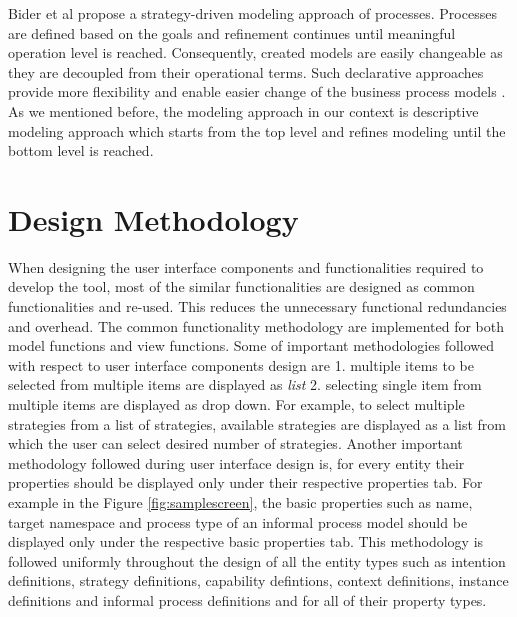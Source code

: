 Bider et al \cite{bider2005strategy} propose a strategy-driven modeling approach of processes. Processes are defined based on the goals and refinement continues until meaningful operation level is reached. Consequently, created models are easily changeable as they are decoupled from their operational terms. Such declarative approaches provide more flexibility and enable easier change of the business process models \cite{Sungur2016}. As we mentioned before, the modeling approach in our context is descriptive modeling approach which starts from the top level and refines modeling until the bottom level is reached. 

\section{Design Methodology}
\label{sec:designmethodology}
When designing the user interface components and functionalities required to develop the tool, most of the similar functionalities are 
designed as common functionalities and re-used. This reduces the unnecessary functional redundancies and overhead. The common functionality methodology are implemented for both model functions and view functions.  Some of important methodologies followed with respect to user interface components design are 1. multiple items to be selected from multiple items are displayed as  \textit{list} 2. selecting single item from multiple items are displayed as drop down. For example, to select multiple strategies from a list of strategies, available strategies are displayed as a list from which the user can select desired number of strategies. Another important methodology followed during user interface design is, for every entity their properties should be displayed only under their respective properties tab. For example in the Figure \ref{fig:samplescreen}, the basic properties such as name, target namespace and process type of an informal process model should be displayed only under the respective basic properties tab. This methodology is followed uniformly throughout the design of all the entity types such as intention definitions, strategy definitions, capability defintions, context definitions, instance definitions and informal process definitions and for all of their property types. 

